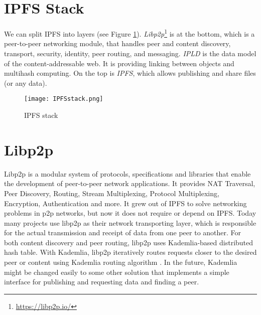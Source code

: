 \section{IPFS Stack}
We can split IPFS into layers (see Figure \ref{IPFSstack}). \textit{Libp2p}\footnote{\url{https://libp2p.io/}} is at the bottom, which is a peer-to-peer networking module, that handles peer and content discovery, transport, security, identity, peer routing, and messaging. \textit{IPLD} is the data model of the content-addressable web. It is providing linking between objects and multihash computing. On the top is \textit{IPFS}, which allows publishing and share files (or any data). \cite{IPFSwhitepaper}


\begin{figure}[h]
    \centering
    \texttt{[image: IPFSstack.png]}
    \caption{IPFS stack}
    \label{IPFSstack}
\end{figure}


\section{Libp2p}
Libp2p is a modular system of protocols, specifications and libraries that enable the development of peer-to-peer network applications. It provides NAT Traversal, Peer Discovery, Routing, Stream Multiplexing, Protocol Multiplexing, Encryption, Authentication and more. It grew out of IPFS to solve networking problems in p2p networks, but now it does not require or depend on IPFS. Today many projects use libp2p as their network transporting layer, which is responsible for the actual transmission and receipt of data from one peer to another. For both content discovery and peer routing, libp2p uses Kademlia-based distributed hash table. With Kademlia, libp2p iteratively routes requests closer to the desired peer or content using Kademlia routing algorithm \cite{kademlia}. In the future, Kademlia might be changed easily to some other solution that implements a simple interface for publishing and requesting data and finding a peer. \cite{WebEngineering}





